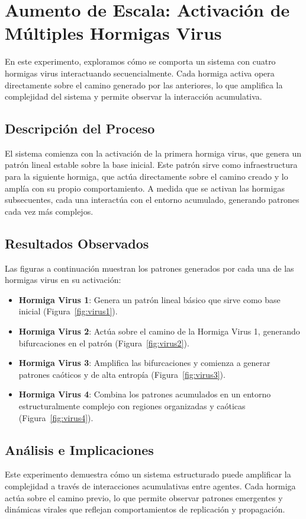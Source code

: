 \documentclass[twocolumn]{article}
\begin{document}
\section{Aumento de Escala: Activación de Múltiples Hormigas Virus}

En este experimento, exploramos cómo se comporta un sistema con cuatro hormigas virus interactuando secuencialmente. Cada hormiga activa opera directamente sobre el camino generado por las anteriores, lo que amplifica la complejidad del sistema y permite observar la interacción acumulativa.

\subsection{Descripción del Proceso}
El sistema comienza con la activación de la primera hormiga virus, que genera un patrón lineal estable sobre la base inicial. Este patrón sirve como infraestructura para la siguiente hormiga, que actúa directamente sobre el camino creado y lo amplía con su propio comportamiento. A medida que se activan las hormigas subsecuentes, cada una interactúa con el entorno acumulado, generando patrones cada vez más complejos.

\subsection{Resultados Observados}
Las figuras a continuación muestran los patrones generados por cada una de las hormigas virus en su activación:
\begin{itemize}
    \item \textbf{Hormiga Virus 1}: Genera un patrón lineal básico que sirve como base inicial (Figura~\ref{fig:virus1}).
    \item \textbf{Hormiga Virus 2}: Actúa sobre el camino de la Hormiga Virus 1, generando bifurcaciones en el patrón (Figura~\ref{fig:virus2}).
    \item \textbf{Hormiga Virus 3}: Amplifica las bifurcaciones y comienza a generar patrones caóticos y de alta entropía (Figura~\ref{fig:virus3}).
    \item \textbf{Hormiga Virus 4}: Combina los patrones acumulados en un entorno estructuralmente complejo con regiones organizadas y caóticas (Figura~\ref{fig:virus4}).
\end{itemize}


\subsection{Análisis e Implicaciones}
Este experimento demuestra cómo un sistema estructurado puede amplificar la complejidad a través de interacciones acumulativas entre agentes. Cada hormiga actúa sobre el camino previo, lo que permite observar patrones emergentes y dinámicas virales que reflejan comportamientos de replicación y propagación.
\end{document}

